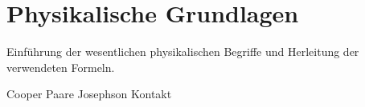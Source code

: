 \section{Physikalische Grundlagen}
Einführung der wesentlichen physikalischen Begriffe und Herleitung der verwendeten Formeln.

Cooper Paare
Josephson Kontakt
